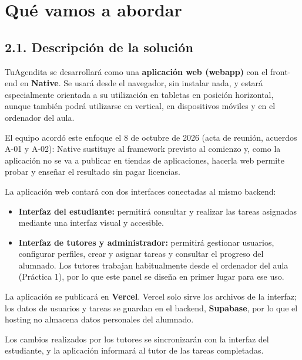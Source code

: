 \documentclass[11pt,a4paper]{article}
\newcommand{\hl}[1]{\textcolor{gblue}{\textbf{#1}}}
\begin{document}
\section{Qué vamos a abordar}
\subsection*{2.1. Descripción de la solución}
TuAgendita se desarrollará como una \hl{aplicación web (webapp)} con el front-end en \hl{Native}. Se usará desde el navegador, sin instalar nada, y estará especialmente orientada a su utilización en tabletas en posición horizontal, aunque también podrá utilizarse en vertical, en dispositivos móviles y en el ordenador del aula.

El equipo acordó este enfoque el 8 de octubre de 2026 (acta de reunión, acuerdos A-01 y A-02): Native sustituye al framework previsto al comienzo y, como la aplicación no se va a publicar en tiendas de aplicaciones, hacerla web permite probar y enseñar el resultado sin pagar licencias.

La aplicación web contará con dos interfaces conectadas al mismo backend:

\begin{itemize}
\item \hl{Interfaz del estudiante:} permitirá consultar y realizar las tareas asignadas mediante una interfaz visual y accesible.
\item \hl{Interfaz de tutores y administrador:} permitirá gestionar usuarios, configurar perfiles, crear y asignar tareas y consultar el progreso del alumnado. Los tutores trabajan habitualmente desde el ordenador del aula (Práctica 1), por lo que este panel se diseña en primer lugar para ese uso.
\end{itemize}
La aplicación se publicará en \hl{Vercel}. Vercel solo sirve los archivos de la interfaz; los datos de usuarios y tareas se guardan en el backend, \hl{Supabase}, por lo que el hosting no almacena datos personales del alumnado.

Los cambios realizados por los tutores se sincronizarán con la interfaz del estudiante, y la aplicación informará al tutor de las tareas completadas.

\end{document}
